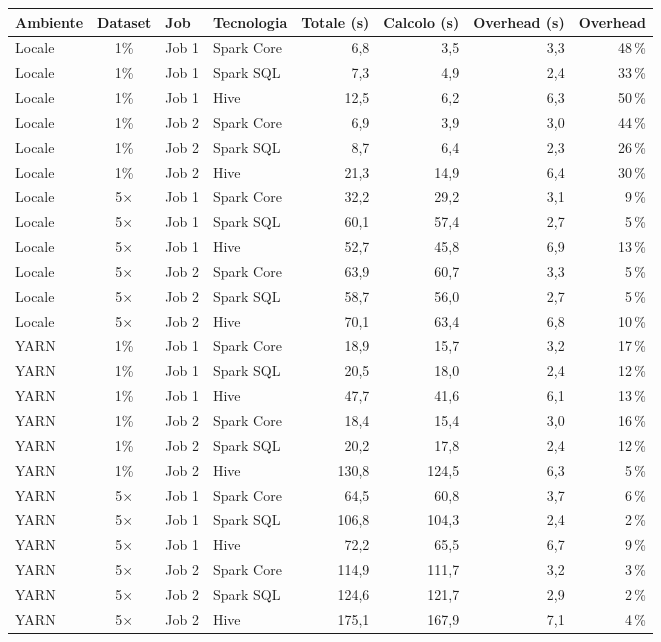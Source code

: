 \begin{tabular}{@{}l c l l r r r r@{}}
\toprule
Ambiente & Dataset & Job & Tecnologia & Totale (s) & Calcolo (s) & Overhead (s) & Overhead \\
\midrule
Locale & 1\% & Job 1 & Spark Core & 6,8 & 3,5 & 3,3 & 48\,\% \\
Locale & 1\% & Job 1 & Spark SQL & 7,3 & 4,9 & 2,4 & 33\,\% \\
Locale & 1\% & Job 1 & Hive & 12,5 & 6,2 & 6,3 & 50\,\% \\
Locale & 1\% & Job 2 & Spark Core & 6,9 & 3,9 & 3,0 & 44\,\% \\
Locale & 1\% & Job 2 & Spark SQL & 8,7 & 6,4 & 2,3 & 26\,\% \\
Locale & 1\% & Job 2 & Hive & 21,3 & 14,9 & 6,4 & 30\,\% \\
\midrule
Locale & 5× & Job 1 & Spark Core & 32,2 & 29,2 & 3,1 & 9\,\% \\
Locale & 5× & Job 1 & Spark SQL & 60,1 & 57,4 & 2,7 & 5\,\% \\
Locale & 5× & Job 1 & Hive & 52,7 & 45,8 & 6,9 & 13\,\% \\
Locale & 5× & Job 2 & Spark Core & 63,9 & 60,7 & 3,3 & 5\,\% \\
Locale & 5× & Job 2 & Spark SQL & 58,7 & 56,0 & 2,7 & 5\,\% \\
Locale & 5× & Job 2 & Hive & 70,1 & 63,4 & 6,8 & 10\,\% \\
\midrule
YARN & 1\% & Job 1 & Spark Core & 18,9 & 15,7 & 3,2 & 17\,\% \\
YARN & 1\% & Job 1 & Spark SQL & 20,5 & 18,0 & 2,4 & 12\,\% \\
YARN & 1\% & Job 1 & Hive & 47,7 & 41,6 & 6,1 & 13\,\% \\
YARN & 1\% & Job 2 & Spark Core & 18,4 & 15,4 & 3,0 & 16\,\% \\
YARN & 1\% & Job 2 & Spark SQL & 20,2 & 17,8 & 2,4 & 12\,\% \\
YARN & 1\% & Job 2 & Hive & 130,8 & 124,5 & 6,3 & 5\,\% \\
\midrule
YARN & 5× & Job 1 & Spark Core & 64,5 & 60,8 & 3,7 & 6\,\% \\
YARN & 5× & Job 1 & Spark SQL & 106,8 & 104,3 & 2,4 & 2\,\% \\
YARN & 5× & Job 1 & Hive & 72,2 & 65,5 & 6,7 & 9\,\% \\
YARN & 5× & Job 2 & Spark Core & 114,9 & 111,7 & 3,2 & 3\,\% \\
YARN & 5× & Job 2 & Spark SQL & 124,6 & 121,7 & 2,9 & 2\,\% \\
YARN & 5× & Job 2 & Hive & 175,1 & 167,9 & 7,1 & 4\,\% \\
\bottomrule
\end{tabular}